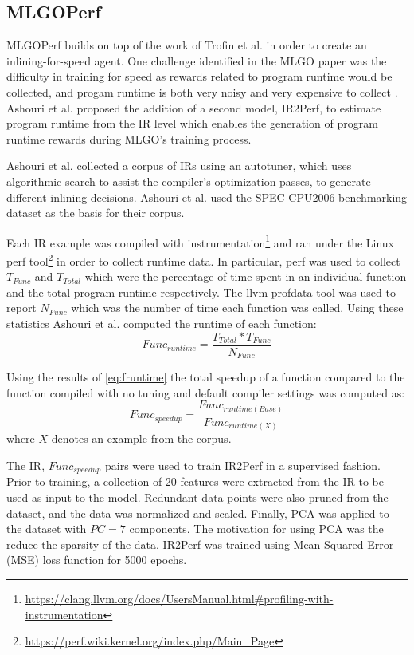 \documentclass[nohyperref]{article}
\theoremstyle{plain}
\theoremstyle{definition}
\theoremstyle{remark}
\begin{document}
\subsection{MLGOPerf}
MLGOPerf \cite{mlgoperf} builds on top of the work of Trofin et al. in order to create an inlining-for-speed agent. One challenge identified in the MLGO paper was the difficulty in training for speed as rewards related to program runtime would be collected, and progam runtime is both very noisy and very expensive to collect \cite{mlgo}. Ashouri et al. proposed the addition of a second model, IR2Perf, to estimate program runtime from the IR level which enables the generation of program runtime rewards during MLGO's training process.

Ashouri et al. collected a corpus of IRs using an autotuner, which uses algorithmic search to assist the compiler's optimization passes, to generate different inlining decisions. Ashouri et al. used the SPEC CPU2006 benchmarking dataset \cite{spec2006} as the basis for their corpus.

Each IR example was compiled with instrumentation\footnote{\href{https://clang.llvm.org/docs/UsersManual.html\#profiling-with-instrumentation}{https://clang.llvm.org/docs/UsersManual.html\#profiling-with-instrumentation}} and ran under the Linux perf tool\footnote{\href{https://perf.wiki.kernel.org/index.php/Main\_Page}{https://perf.wiki.kernel.org/index.php/Main\_Page}} in order to collect runtime data. In particular, perf was used to collect $T_{Func}$ and $T_{Total}$ which were the percentage of time spent in an individual function and the total program runtime respectively. The llvm-profdata tool was used to report $N_{Func}$ which was the number of time each function was called. Using these statistics Ashouri et al. computed the runtime of each function:
\begin{equation} \label{eq:fruntime}
    Func_{runtime} = \frac{T_{Total} * T_{Func}}{N_{Func}}
\end{equation}

Using the results of \ref{eq:fruntime} the total speedup of a function compared to the function compiled with no tuning and default compiler settings was computed as:
\begin{equation}
    Func_{speedup} = \frac{Func_{runtime(Base)}}{Func_{runtime(X)}}
\end{equation}
where $X$ denotes an example from the corpus.

The IR, $Func_{speedup}$ pairs were used to train IR2Perf in a supervised fashion. Prior to training, a collection of 20 features were extracted from the IR to be used as input to the model. Redundant data points were also pruned from the dataset, and the data was normalized and scaled. Finally, PCA was applied to the dataset with $PC=7$ components. The motivation for using PCA was the reduce the sparsity of the data. IR2Perf was trained using Mean Squared Error (MSE) loss function for 5000 epochs.
\end{document}
